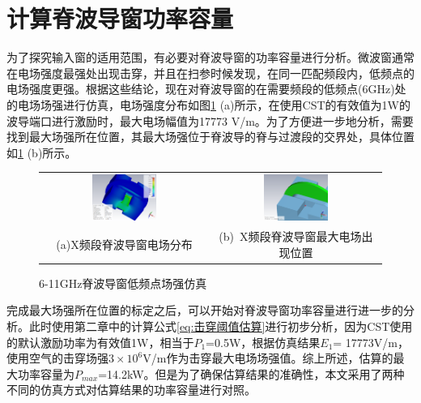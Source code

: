 \documentclass[master]{thesis-uestc}
\begin{document}
\section{计算脊波导窗功率容量}
为了探究输入窗的适用范围，有必要对脊波导窗的功率容量进行分析。微波窗通常在电场强度最强处出现击穿，并且在扫参时候发现，在同一匹配频段内，低频点的电场强度更强。根据这些结论，现在对脊波导窗的在需要频段的低频点(6GHz)处的电场场强进行仿真，电场强度分布如图\ref{fig:X频段脊波导窗低频点场强仿真} (a)所示，在使用CST的有效值为1W的波导端口进行激励时，最大电场幅值为17773 V/m。为了方便进一步地分析，需要找到最大场强所在位置，其最大场强位于脊波导的脊与过渡段的交界处，具体位置如\ref{fig:X频段脊波导窗低频点场强仿真} (b)所示。
\begin{figure}[!htb]
    \small
    \centering
    \begin{tabular}{@{\ }c@{\ }c}
        \includegraphics[width=0.4\textwidth]{pic/chapter3/X频段等效1W最大场强.png} & 
        \hspace{5pt}
        \includegraphics[width=0.4\textwidth]{pic/chapter3/X频段最大场强出现位置.png}     \\
        \mbox{\small (a)X频段脊波导窗电场分布}                                                                               & 
        \mbox{\small (b) X频段脊波导窗最大电场出现位置}                                                                                  \\
    \end{tabular}
    \caption{6-11GHz脊波导窗低频点场强仿真}
    \label{fig:X频段脊波导窗低频点场强仿真}
\end{figure}

完成最大场强所在位置的标定之后，可以开始对脊波导窗功率容量进行进一步的分析。此时使用第二章中的计算公式\ref{eq:击穿阈值估算}进行初步分析，因为CST使用的默认激励功率为有效值1W，相当于\(P_{1}\)=0.5W，根据仿真结果\(E_1 \)= 17773V/m，使用空气的击穿场强\(3 \times 10^6\)V/m作为击穿最大电场场强值。综上所述，估算的最大功率容量为\(P_{max}\)=14.2kW。但是为了确保估算结果的准确性，本文采用了两种不同的仿真方式对估算结果的功率容量进行对照。
\end{document}
